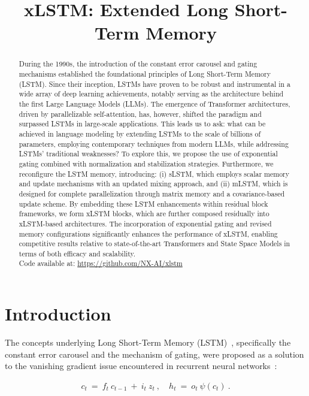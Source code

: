 \title{xLSTM: Extended Long Short-Term Memory}

\begin{abstract}
During the 1990s, the introduction of the constant error carousel and gating mechanisms established the foundational principles of Long Short-Term Memory (LSTM). Since their inception, LSTMs have proven to be robust and instrumental in a wide array of deep learning achievements, notably serving as the architecture behind the first Large Language Models (LLMs). The emergence of Transformer architectures, driven by parallelizable self-attention, has, however, shifted the paradigm and surpassed LSTMs in large-scale applications. This leads us to ask: what can be achieved in language modeling by extending LSTMs to the scale of billions of parameters, employing contemporary techniques from modern LLMs, while addressing LSTMs' traditional weaknesses? To explore this, we propose the use of exponential gating combined with normalization and stabilization strategies. Furthermore, we reconfigure the LSTM memory, introducing: (i) sLSTM, which employs scalar memory and update mechanisms with an updated mixing approach, and (ii) mLSTM, which is designed for complete parallelization through matrix memory and a covariance-based update scheme. By embedding these LSTM enhancements within residual block frameworks, we form xLSTM blocks, which are further composed residually into xLSTM-based architectures. The incorporation of exponential gating and revised memory configurations significantly enhances the performance of xLSTM, enabling competitive results relative to state-of-the-art Transformers and State Space Models in terms of both efficacy and scalability.\\
Code available at: \url{https://github.com/NX-AI/xlstm}
\end{abstract}

\section{Introduction}
\label{sec:intro}

The concepts underlying Long Short-Term Memory (LSTM)~\citep{Hochreiter:91,Hochreiter:97nips,Hochreiter:97}, specifically the constant error carousel and the mechanism of gating, were proposed as a solution to the vanishing gradient issue encountered in recurrent neural networks~\citep{Hochreiter:91,Hochreiter:00book}:

\begin{align}
\label{eq:lstm_idea}
  c_t \ = \ f_t \ c_{t-1} \ + \ 
          i_t \  z_t \ , \quad  
          h_t \ = \ o_t \ \psi({c_t}) \ . 
\end{align}


